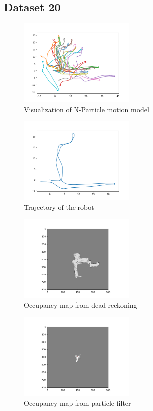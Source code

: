 \documentclass[a4paper]{article}
\begin{document}
\subsection{Dataset 20}
\begin{figure}[h]
    \centering
    \includegraphics[width=0.5\textwidth]{visualization.png}
    \caption{Visualization of N-Particle motion model}
    \label{fig:N-Particle trajectory}
\end{figure}
\begin{figure}[h]
    \centering
    \includegraphics[width=0.5\textwidth]{trajectory.png}
    \caption{Trajectory of the robot}
    \label{fig:trajectory}
\end{figure}
\begin{figure}[h]
    \centering
    \includegraphics[width=0.5\textwidth]{dead_reckon.png}
    \caption{Occupancy map from dead reckoning}
    \label{fig:occupancy_map}
\end{figure}
\begin{figure}[h]
    \centering
    \includegraphics[width=0.5\textwidth]{map0.png}
    \caption{Occupancy map from particle filter}
    \label{fig:particle_filter}
\end{figure}
\end{document}

